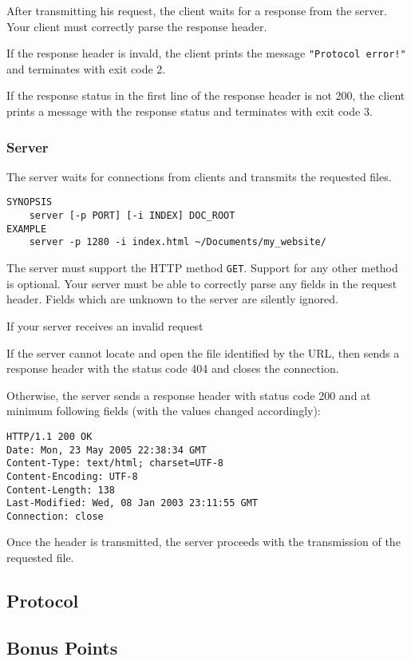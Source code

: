 After transmitting his request, the client waits for a response from the server.
Your client must correctly parse the response header.

If the response header is invald,
the client prints the message \texttt{"Protocol error!"}
and terminates with exit code 2.

If the response status in the first line of the response header is not 200,
the client prints a message with the response status
and terminates with exit code 3.

\subsubsection*{Server}

The server waits for connections from clients
and transmits the requested files.

\begin{verbatim}
SYNOPSIS
    server [-p PORT] [-i INDEX] DOC_ROOT
EXAMPLE
    server -p 1280 -i index.html ~/Documents/my_website/
\end{verbatim}


The server must support the HTTP method \texttt{GET}.
Support for any other method is optional.
Your server must be able to correctly parse any fields in the request header.
Fields which are unknown to the server are silently ignored.


If your server receives an invalid request

If the server cannot locate and open the file identified by the URL,
then sends a response header with the status code 404
and closes the connection.

Otherwise, the server sends a response header with status code 200
and at minimum following fields (with the values changed accordingly):
\begin{verbatim}
HTTP/1.1 200 OK
Date: Mon, 23 May 2005 22:38:34 GMT
Content-Type: text/html; charset=UTF-8
Content-Encoding: UTF-8
Content-Length: 138
Last-Modified: Wed, 08 Jan 2003 23:11:55 GMT
Connection: close
\end{verbatim}
Once the header is transmitted,
the server proceeds with the transmission of the requested file.

\subsection*{Protocol}
\label{sec:prot}

\subsection*{Bonus Points}

